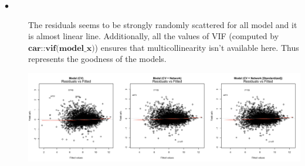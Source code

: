 \documentclass{article}\usepackage[]{graphicx}\usepackage[]{color}
\begin{document}
\begin{description}
  \item[$\bullet$] The residuals seems to be strongly randomly scattered for all model and it is almost linear line. Additionally, all the values of VIF (computed by $\textbf{car::vif(model\_x)}$) ensures that multicollinearity isn’t available here. Thus represents the goodness of the models. 
    \begin{center}
    \includegraphics[scale=0.33]{ResidualPlots_TableS2.png}
    \end{center}
\end{description}

\newpage
\end{document}
